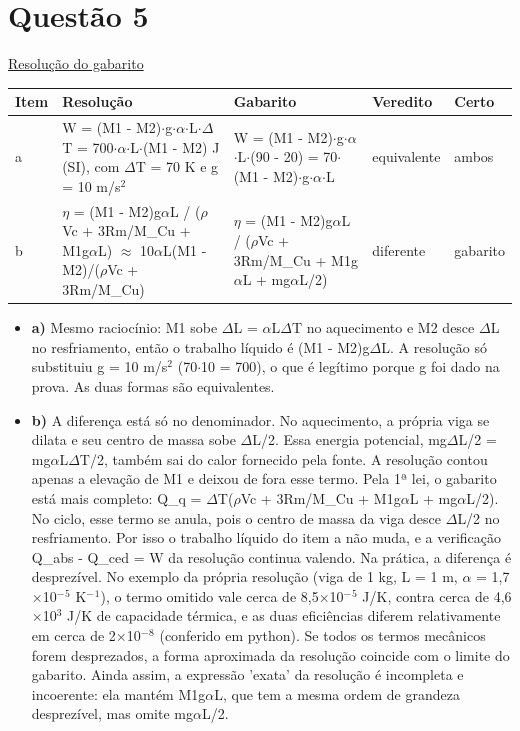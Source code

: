 \documentclass{article}%
\begin{document}
\section*{Questão 5}%
\href{https://poliedroresolve.sistemapoliedro.com.br/vestibulares/ita/2026/ita-2-fase-dia-3-30-10-2025-2-fase-dia-3/dissertativa-5-fisica-2-fase-dia-3-ita-2026}{Resolução do gabarito}\par\smallskip%
\begin{longtable}{@{}p{} p{} p{} p{} p{}@{}}\toprule Item & Resolução & Gabarito & Veredito & Certo \\ \midrule
a & W = (M1 - M2)$\cdot$g$\cdot$$\alpha$$\cdot$L$\cdot$$\Delta$T = 700$\cdot$$\alpha$$\cdot$L$\cdot$(M1 - M2) J (SI), com $\Delta$T = 70 K e g = 10 m/s$^2$ & W = (M1 - M2)$\cdot$g$\cdot$$\alpha$$\cdot$L$\cdot$(90 - 20) = 70$\cdot$(M1 - M2)$\cdot$g$\cdot$$\alpha$$\cdot$L & equivalente & ambos \\
b & $\eta$ = (M1 - M2)g$\alpha$L / ($\rho$Vc + 3Rm/M\_Cu + M1g$\alpha$L) $\approx$ 10$\alpha$L(M1 - M2)/($\rho$Vc + 3Rm/M\_Cu) & $\eta$ = (M1 - M2)g$\alpha$L / ($\rho$Vc + 3Rm/M\_Cu + M1g$\alpha$L + mg$\alpha$L/2) & diferente & gabarito \\
\bottomrule\end{longtable}%
\begin{itemize}%
\item%
\textbf{a)} Mesmo raciocínio: M1 sobe $\Delta$L = $\alpha$L$\Delta$T no aquecimento e M2 desce $\Delta$L no resfriamento, então o trabalho líquido é (M1 - M2)g$\Delta$L. A resolução só substituiu g = 10 m/s$^2$ (70$\cdot$10 = 700), o que é legítimo porque g foi dado na prova. As duas formas são equivalentes.%
\item%
\textbf{b)} A diferença está só no denominador. No aquecimento, a própria viga se dilata e seu centro de massa sobe $\Delta$L/2. Essa energia potencial, mg$\Delta$L/2 = mg$\alpha$L$\Delta$T/2, também sai do calor fornecido pela fonte. A resolução contou apenas a elevação de M1 e deixou de fora esse termo. Pela 1ª lei, o gabarito está mais completo: Q\_q = $\Delta$T($\rho$Vc + 3Rm/M\_Cu + M1g$\alpha$L + mg$\alpha$L/2). No ciclo, esse termo se anula, pois o centro de massa da viga desce $\Delta$L/2 no resfriamento. Por isso o trabalho líquido do item a não muda, e a verificação Q\_abs - Q\_ced = W da resolução continua valendo. Na prática, a diferença é desprezível. No exemplo da própria resolução (viga de 1 kg, L = 1 m, $\alpha$ = 1,7$\times$10$^{-}$$^{5}$ K$^{-}$$^{1}$), o termo omitido vale cerca de 8,5$\times$10$^{-}$$^{5}$ J/K, contra cerca de 4,6$\times$10$^3$ J/K de capacidade térmica, e as duas eficiências diferem relativamente em cerca de 2$\times$10$^{-}$$^{8}$ (conferido em python). Se todos os termos mecânicos forem desprezados, a forma aproximada da resolução coincide com o limite do gabarito. Ainda assim, a expressão 'exata' da resolução é incompleta e incoerente: ela mantém M1g$\alpha$L, que tem a mesma ordem de grandeza desprezível, mas omite mg$\alpha$L/2.%
\end{itemize}%
\end{document}
